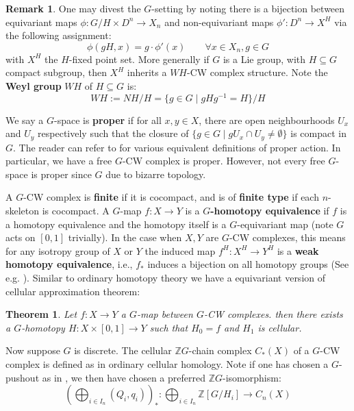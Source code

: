 \documentclass[11pt]{report}
\theoremstyle{definition}
\newtheorem{Rmk}{Remark}[chapter]
\theoremstyle{plain}
\newtheorem{Theo}[Def]{Theorem}
\newcommand{\integer}{\mathbb{Z}}
\begin{document}
\begin{Rmk}
One may divest the $G$-setting by noting there is a bijection between equivariant maps $\phi:G/H\times D^n\to X_{n}$ and non-equivariant maps $\phi':D^n\to X^H$ via the following assignment:
	\begin{equation}
	\phi(gH, x)=g\cdot \phi'(x) \qquad \forall x\in X_n, g\in G
	\end{equation}
	with $X^H$ the $H$-fixed point set. More generally if $G$ is a Lie group, with $H\subseteq G$ compact subgroup, then $X^H$ inherits a $WH$-CW complex structure. Note the \textbf{Weyl group} $WH$ of $H\subseteq G$ is:
	\begin{equation}
	WH:=NH/H=\{g\in G\mid gHg^{-1}=H\}/H
	\end{equation}
\end{Rmk}
We say a $G$-space is \textbf{proper} if for all $x,y\in X$, there are open neighbourhoods $U_x$ and $U_y$ respectively such that the closure of $\{g\in G\mid gU_x\cap U_y\neq \emptyset \}$ is compact in $G$. The reader can refer to \cite[Chapter~I.3]{tom1987} for various equivalent definitions of proper action. In particular, we have a free $G$-CW complex is proper. However, not every free $G$-space is proper since $G$ due to bizarre topology.
\par A $G$-CW complex is \textbf{finite} if it is cocompact, and is of \textbf{finite type} if each $n$-skeleton is cocompact. A $G$-map $f:X\to Y$ is a \textbf{$G$-homotopy equivalence} if $f$ is a homotopy equivalence and the homotopy itself is a $G$-equivariant map (note $G$ acts on $[0,1]$ trivially). In the case when $X, Y$ are $G$-CW complexes, this means for any isotropy group of $X$ or $Y$ the induced map $f^H:X^H\to Y^H$ is a \textbf{weak homotopy equivalence}, i.e., $f_*$ induces a bijection on all homotopy groups (See e.g. \cite[Chapter~II, Proposition~2.7]{tom1987}). Similar to ordinary homotopy theory we have a equivariant version of cellular approximation theorem: 
\begin{Theo}\cite[Chapter~II, Theorem~2.1]{tom1987}\label{tom2.2.1}
Let $f: X\to Y$ a $G$-map between $G$-CW complexes. then there exists a $G$-homotopy $H:X\times [0,1]\to Y$ such that $H_0=f$ and $H_1$ is cellular.
\end{Theo}
Now suppose $G$ is discrete. The cellular $\integer G$-chain complex $C_*(X)$ of a $G$-CW complex is defined as in ordinary cellular homology. Note if one has chosen a $G$-pushout as in , we then have chosen a preferred $\integer G$-isomorphism:
\begin{equation}
(\bigoplus_{i\in I_n}(Q_i, q_i))_*:\bigoplus_{i\in I_n} \integer[G/H_i]\longrightarrow C_n(X)
\end{equation}
\end{document}
